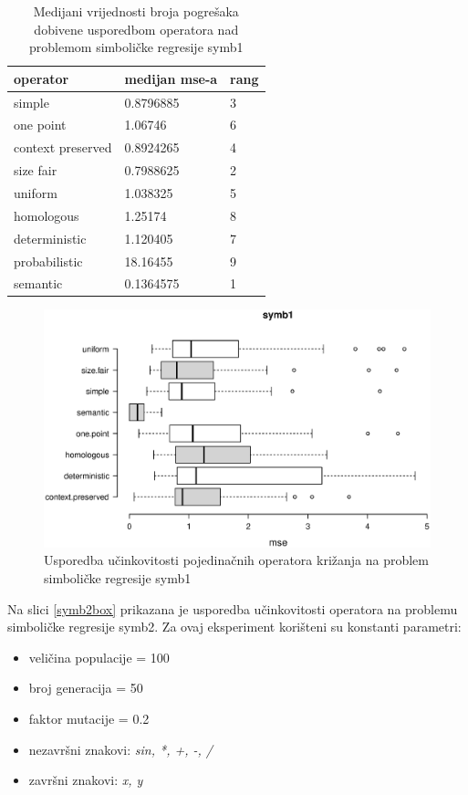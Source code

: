 \begin{table}[H]
 	\centering
 \caption{Medijani vrijednosti broja pogrešaka dobivene usporedbom operatora nad problemom simboličke regresije symb1}
    \begin{tabular}{| l | l | l |}
    \hline
    \textbf{operator} & \textbf{medijan mse-a} & \textbf{rang}\\ \hline
    simple & 0.8796885 & 3\\ \hline
    one point & 1.06746 & 6\\ \hline
    context preserved & 0.8924265 & 4\\ \hline
    size fair & 0.7988625 & 2\\ \hline
    uniform & 1.038325 & 5\\ \hline
    homologous & 1.25174 & 8\\ \hline
    deterministic & 1.120405 & 7\\ \hline
    probabilistic & 18.16455 & 9\\ \hline
    semantic & 0.1364575 & 1\\ \hline
    \end{tabular}
    
   
    \label{symb1table}
\end{table}

\begin{figure}[H]
	\centering
	\includegraphics[trim=0cm 4cm 0cm 0cm, scale=0.6]{./slike/boxPlots/symb1.eps}
	\caption{Usporedba učinkovitosti pojedinačnih operatora križanja na problem simboličke regresije symb1}
	\label{symb1box}
\end{figure}



Na slici \ref{symb2box} prikazana je usporedba učinkovitosti operatora na problemu simboličke regresije symb2. Za ovaj eksperiment korišteni su konstanti parametri:
\begin{itemize}
\item{veličina populacije = 100}
\item{broj generacija = 50}
\item{faktor mutacije = 0.2}
\item{nezavršni znakovi: \textit{sin, *, +, -, /}}
\item{završni znakovi: \textit{x, y}}
\end{itemize} 

